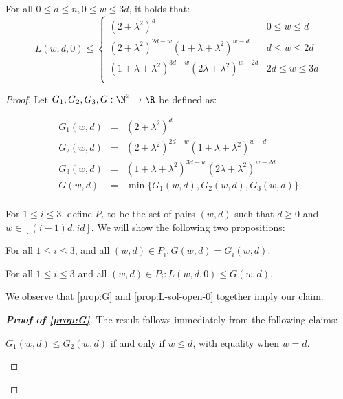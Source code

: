 \begin{lemma} 
\label{lem:Lwdo-0}
For all $0\le d\le n, 0\le w\le 3d$, it holds that:
\[
L(w,d,0) \le
\begin{cases}
(2+\lambda^2)^d & 0\le w \le d\\
(2+\lambda^2)^{2d-w}(1+\lambda+\lambda^2)^{w-d} & d\le w\le 2d\\
(1+\lambda+\lambda^2)^{3d-w}(2\lambda+\lambda^2)^{w-2d} & 2d\le w\le 3d\\
\end{cases}
\]
\end{lemma}

\begin{proof}

Let $G_1, G_2, G_3, G: \N^2\rightarrow \R$ be defined as:

\begin{eqnarray*}
G_1(w, d) & = & (2+\lambda^2)^d\\
G_2(w, d) & = & (2+\lambda^2)^{2d-w}(1+\lambda+\lambda^2)^{w-d}\\
G_3(w, d) & = & (1+\lambda+\lambda^2)^{3d-w}(2\lambda+\lambda^2)^{w-2d}\\
G(w, d) & = & \min\{G_1(w, d), G_2(w, d), G_3(w, d)\}\\
\end{eqnarray*}

For $1\le i\le 3$, define $P_i$ to be the set of pairs $(w, d)$ such that $d \ge 0$ and $w\in [(i-1)d, id]$. We will show the following two propositions:

\begin{proposition}
\label{prop:G}
For all $1\le i\le 3$, and all $(w, d)\in P_i: G(w, d) = G_i(w, d)$.
\end{proposition}

\begin{proposition}
\label{prop:L-sol-open-0}
For all $1\le i\le 3$ and all $(w, d)\in P_i: L(w, d, 0) \le G(w, d)$.
\end{proposition}

We observe that \cref{prop:G} and \cref{prop:L-sol-open-0} together imply our claim.

\begin{proof}[\textbf{Proof of \cref{prop:G}}]
The result follows immediately from the following claims:
\begin{claim}
\label{claim:G-sol-1}
$G_1(w,d) \leq G_2(w,d)$ if and only if $w \leq d$, with equality when $w=d$.
\end{claim}


\end{proof}
\end{proof}
